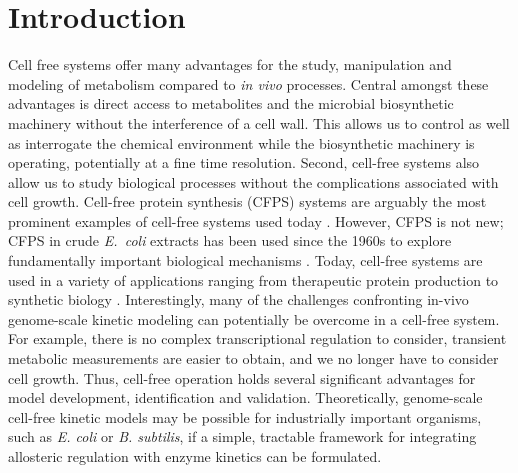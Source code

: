 \documentclass[journal=asbcd6,manuscript=article]{achemso}
\begin{document}
\section{Introduction}
Cell free systems offer many advantages for the study, manipulation and modeling of metabolism compared to \textit{in vivo} processes.
Central amongst these advantages is direct access to metabolites and the microbial biosynthetic machinery without the interference of a cell wall.
This allows us to control as well as interrogate the chemical environment while the biosynthetic machinery is operating, potentially at a fine time resolution.
Second, cell-free systems also allow us to study biological processes without the complications associated with cell growth.
Cell-free protein synthesis (CFPS) systems are arguably the most prominent examples of cell-free systems used today \cite{Jewett:2008aa}.
However, CFPS is not new; CFPS in crude \textit{E.~coli} extracts has been used since the 1960s to explore fundamentally important biological mechanisms \cite{MATTHAEI:1961aa,NIRENBERG:1961aa}.
Today, cell-free systems are used in a variety of applications ranging from therapeutic protein production \cite{Lu:2014aa} to synthetic biology \cite{Hodgman:2012aa}.
Interestingly, many of the challenges confronting in-vivo genome-scale kinetic modeling can potentially be overcome in a cell-free system.
For example, there is no complex transcriptional regulation to consider, transient metabolic measurements are easier to obtain, and we no longer have to consider cell growth.
Thus, cell-free operation holds several significant advantages for model development, identification and validation.
Theoretically, genome-scale cell-free kinetic models may be possible for industrially important organisms, such as \textit{E. coli} or \textit{B. subtilis}, if a simple, tractable framework for integrating allosteric regulation with enzyme kinetics can be formulated.
\end{document}

